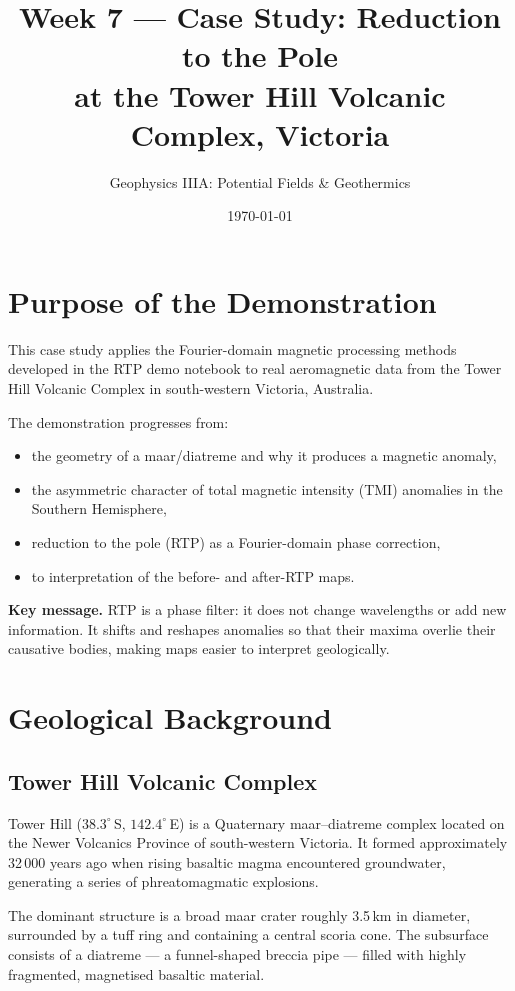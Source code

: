 \documentclass[11pt,a4paper]{article}
\title{Week 7 --- Case Study: Reduction to the Pole\\
at the Tower Hill Volcanic Complex, Victoria}
\author{Geophysics IIIA: Potential Fields \& Geothermics}
\date{\today}
\begin{document}
\maketitle

\section{Purpose of the Demonstration}

This case study applies the Fourier-domain magnetic processing methods developed
in the RTP demo notebook to real aeromagnetic data from the
Tower Hill Volcanic Complex in south-western Victoria, Australia.

The demonstration progresses from:
\begin{itemize}
  \item the geometry of a maar/diatreme and why it produces a magnetic anomaly,
  \item the asymmetric character of total magnetic intensity (TMI) anomalies
        in the Southern Hemisphere,
  \item reduction to the pole (RTP) as a Fourier-domain phase correction,
  \item to interpretation of the before- and after-RTP maps.
\end{itemize}

\noindent\textbf{Key message.}
RTP is a phase filter: it does not change wavelengths or add new information.
It shifts and reshapes anomalies so that their maxima overlie their causative
bodies, making maps easier to interpret geologically.

\section{Geological Background}

\subsection{Tower Hill Volcanic Complex}

Tower Hill ($38.3^\circ$\,S, $142.4^\circ$\,E) is a Quaternary maar–diatreme complex
located on the Newer Volcanics Province of south-western Victoria.
It formed approximately 32\,000 years ago when rising basaltic magma
encountered groundwater, generating a series of phreatomagmatic explosions.

The dominant structure is a broad maar crater roughly 3.5\,km in diameter,
surrounded by a tuff ring and containing a central scoria cone.
The subsurface consists of a diatreme --- a funnel-shaped breccia pipe ---
filled with highly fragmented, magnetised basaltic material.
\end{document}
